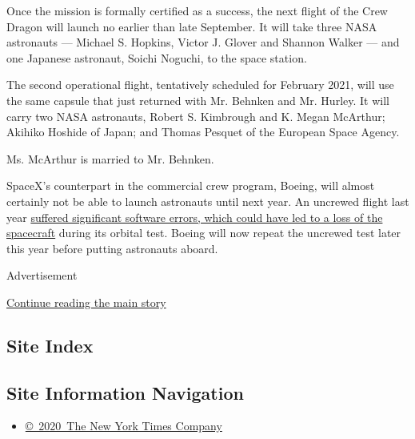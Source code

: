 Once the mission is formally certified as a success, the next flight of
the Crew Dragon will launch no earlier than late September. It will take
three NASA astronauts --- Michael S. Hopkins, Victor J. Glover and
Shannon Walker --- and one Japanese astronaut, Soichi Noguchi, to the
space station.

The second operational flight, tentatively scheduled for February 2021,
will use the same capsule that just returned with Mr. Behnken and Mr.
Hurley. It will carry two NASA astronauts, Robert S. Kimbrough and K.
Megan McArthur; Akihiko Hoshide of Japan; and Thomas Pesquet of the
European Space Agency.

Ms. McArthur is married to Mr. Behnken.

SpaceX's counterpart in the commercial crew program, Boeing, will almost
certainly not be able to launch astronauts until next year. An uncrewed
flight last year
\href{https://www.nytimes.com/2020/07/07/science/boeing-starliner-nasa.html}{suffered
significant software errors, which could have led to a loss of the
spacecraft} during its orbital test. Boeing will now repeat the uncrewed
test later this year before putting astronauts aboard.

Advertisement

\protect\hyperlink{after-bottom}{Continue reading the main story}

\hypertarget{site-index}{%
\subsection{Site Index}\label{site-index}}

\hypertarget{site-information-navigation}{%
\subsection{Site Information
Navigation}\label{site-information-navigation}}

\begin{itemize}
\tightlist
\item
  \href{https://help.nytimes.com/hc/en-us/articles/115014792127-Copyright-notice}{©~2020~The
  New York Times Company}
\end{itemize}

